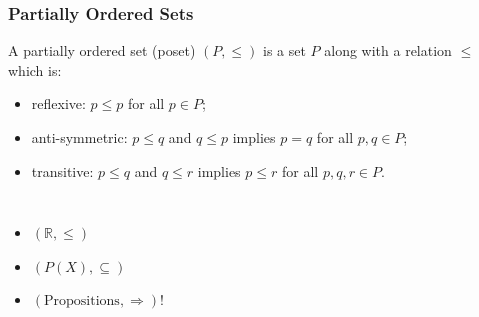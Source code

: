 \documentclass{beamer}
\begin{document}
\begin{frame}

	\frametitle{Partially Ordered Sets}
	
	\begin{definition}
	
		A partially ordered set (poset) $(P,\leq)$ is a set $P$ along with a relation $\leq$ which is:
		\begin{itemize}
		
			\item reflexive: $p\leq p$ for all $p\in P$;
			\item anti-symmetric: $p\leq q$ and $q\leq p$ implies $p=q$ for all $p,q\in P$;
			\item transitive: $p\leq q$ and $q\leq r$ implies $p\leq r$ for all $p,q,r\in P$.   		
		
		\end{itemize}			
	
	\end{definition}
	
\end{frame}

\begin{frame}	
	

	\begin{example}	
		\begin{columns}	
	
			\begin{itemize}
	
				\item $(\mathbb{R},\leq)$
				\item $(P(X),\subseteq)$
				\item $(\text{Propositions},\Rightarrow)$!	
	
			\end{itemize}
		
		
		\end{columns}
	\end{example}

\end{frame}	
\end{document}
